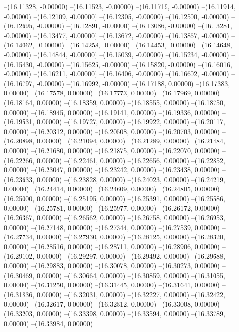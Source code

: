 --(16.11328, -0.00000)
--(16.11523, -0.00000)
--(16.11719, -0.00000)
--(16.11914, -0.00000)
--(16.12109, -0.00000)
--(16.12305, -0.00000)
--(16.12500, -0.00000)
--(16.12695, -0.00000)
--(16.12891, -0.00000)
--(16.13086, -0.00000)
--(16.13281, -0.00000)
--(16.13477, -0.00000)
--(16.13672, -0.00000)
--(16.13867, -0.00000)
--(16.14062, -0.00000)
--(16.14258, -0.00000)
--(16.14453, -0.00000)
--(16.14648, -0.00000)
--(16.14844, -0.00000)
--(16.15039, -0.00000)
--(16.15234, -0.00000)
--(16.15430, -0.00000)
--(16.15625, -0.00000)
--(16.15820, -0.00000)
--(16.16016, -0.00000)
--(16.16211, -0.00000)
--(16.16406, -0.00000)
--(16.16602, -0.00000)
--(16.16797, -0.00000)
--(16.16992, -0.00000)
--(16.17188, 0.00000)
--(16.17383, 0.00000)
--(16.17578, 0.00000)
--(16.17773, 0.00000)
--(16.17969, 0.00000)
--(16.18164, 0.00000)
--(16.18359, 0.00000)
--(16.18555, 0.00000)
--(16.18750, 0.00000)
--(16.18945, 0.00000)
--(16.19141, 0.00000)
--(16.19336, 0.00000)
--(16.19531, 0.00000)
--(16.19727, 0.00000)
--(16.19922, 0.00000)
--(16.20117, 0.00000)
--(16.20312, 0.00000)
--(16.20508, 0.00000)
--(16.20703, 0.00000)
--(16.20898, 0.00000)
--(16.21094, 0.00000)
--(16.21289, 0.00000)
--(16.21484, 0.00000)
--(16.21680, 0.00000)
--(16.21875, 0.00000)
--(16.22070, 0.00000)
--(16.22266, 0.00000)
--(16.22461, 0.00000)
--(16.22656, 0.00000)
--(16.22852, 0.00000)
--(16.23047, 0.00000)
--(16.23242, 0.00000)
--(16.23438, 0.00000)
--(16.23633, 0.00000)
--(16.23828, 0.00000)
--(16.24023, 0.00000)
--(16.24219, 0.00000)
--(16.24414, 0.00000)
--(16.24609, 0.00000)
--(16.24805, 0.00000)
--(16.25000, 0.00000)
--(16.25195, 0.00000)
--(16.25391, 0.00000)
--(16.25586, 0.00000)
--(16.25781, 0.00000)
--(16.25977, 0.00000)
--(16.26172, 0.00000)
--(16.26367, 0.00000)
--(16.26562, 0.00000)
--(16.26758, 0.00000)
--(16.26953, 0.00000)
--(16.27148, 0.00000)
--(16.27344, 0.00000)
--(16.27539, 0.00000)
--(16.27734, 0.00000)
--(16.27930, 0.00000)
--(16.28125, 0.00000)
--(16.28320, 0.00000)
--(16.28516, 0.00000)
--(16.28711, 0.00000)
--(16.28906, 0.00000)
--(16.29102, 0.00000)
--(16.29297, 0.00000)
--(16.29492, 0.00000)
--(16.29688, 0.00000)
--(16.29883, 0.00000)
--(16.30078, 0.00000)
--(16.30273, 0.00000)
--(16.30469, 0.00000)
--(16.30664, 0.00000)
--(16.30859, 0.00000)
--(16.31055, 0.00000)
--(16.31250, 0.00000)
--(16.31445, 0.00000)
--(16.31641, 0.00000)
--(16.31836, 0.00000)
--(16.32031, 0.00000)
--(16.32227, 0.00000)
--(16.32422, 0.00000)
--(16.32617, 0.00000)
--(16.32812, 0.00000)
--(16.33008, 0.00000)
--(16.33203, 0.00000)
--(16.33398, 0.00000)
--(16.33594, 0.00000)
--(16.33789, 0.00000)
--(16.33984, 0.00000)
